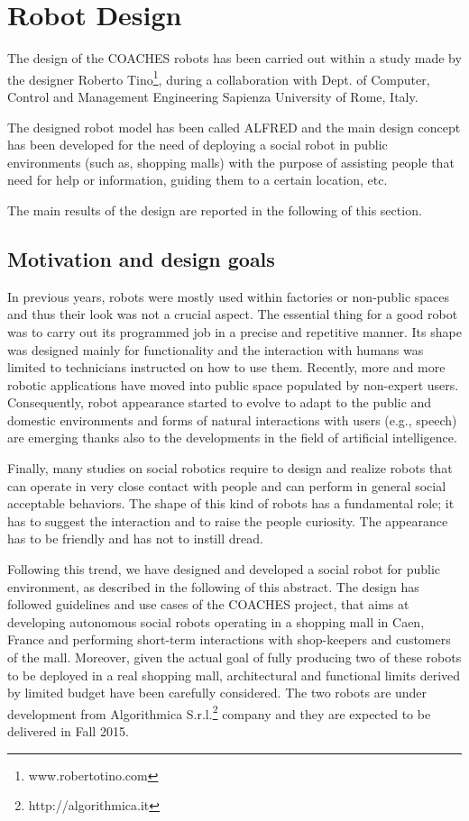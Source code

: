 \section{Robot Design}

The design of the COACHES robots has been carried out within a study made by
the designer Roberto Tino\footnote{www.robertotino.com}, during a collaboration
with Dept. of Computer, Control and Management Engineering Sapienza University of Rome, Italy.


The designed robot model has been called ALFRED and the main design concept has been developed for the need of deploying a social robot in public environments (such as, shopping malls) with the purpose of assisting people that need for help or
information, guiding them to a certain location, etc.

The main results of the design are reported in the following of this section.


\subsection{Motivation and design goals}

In previous years, robots were mostly used within
factories or non-public spaces and thus their look was not
a crucial aspect. The essential thing for a good robot was
to carry out its programmed job in a precise and
repetitive manner. Its shape was designed mainly for
functionality and the interaction with humans was limited
to technicians instructed on how to use them.
Recently, more and more robotic applications have
moved into public space populated by non-expert users.
Consequently, robot appearance started to evolve to adapt
to the public and domestic environments and forms of
natural interactions with users (e.g., speech) are emerging
thanks also to the developments in the field of artificial
intelligence.

Finally, many studies on social robotics require to design and realize robots that can operate in very close
contact with people and can perform in general social acceptable behaviors. The shape of this kind of robots
has a fundamental role; it has to suggest the interaction and to raise the people curiosity. The appearance has
to be friendly and has not to instill dread.

Following this trend, we have designed and developed a social robot for public environment, as described in
the following of this abstract. The design has followed guidelines and use cases of the COACHES project,
that aims at developing autonomous social robots operating in a shopping mall in Caen, France and
performing short-term interactions with shop-keepers and customers of the mall.
Moreover, given the actual goal of fully producing two of these robots to be deployed in a real shopping
mall, architectural and functional limits derived by limited budget have been carefully considered.
The two robots are under development from Algorithmica S.r.l.\footnote{http://algorithmica.it} company and they are expected to be delivered in Fall 2015.

